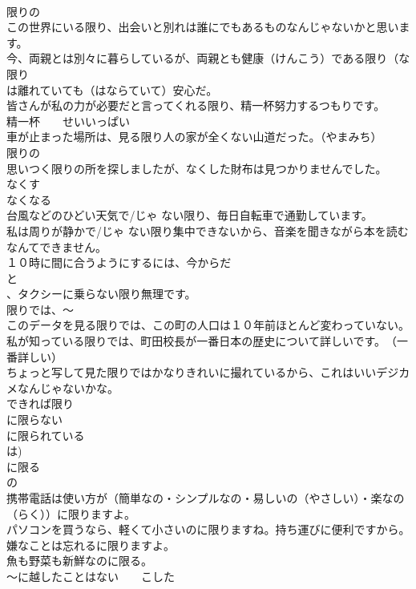 \documentclass[8pt]{extreport}
\begin{document}
\begin{CJK}{UTF8}{min}
\\	限りの
\\	この世界にいる限り、出会いと別れは誰にでもあるものなんじゃないかと思います。
\\	今、両親とは別々に暮らしているが、両親とも健康（けんこう）である限り（な限り 
\\	は離れていても（はならていて）安心だ。
\\	皆さんが私の力が必要だと言ってくれる限り、精一杯努力するつもりです。
\\	精一杯　　せいいっぱい
\\	車が止まった場所は、見る限り人の家が全くない山道だった。（やまみち）
\\	限りの
\\	思いつく限りの所を探しましたが、なくした財布は見つかりませんでした。
\\	なくす
\\	なくなる
\\	台風などのひどい天気で/じゃ ない限り、毎日自転車で通勤しています。
\\	私は周りが静かで/じゃ ない限り集中できないから、音楽を聞きながら本を読むなんてできません。
\\	１０時に間に合うようにするには、今からだ
\\	と
\\	、タクシーに乗らない限り無理です。
\\	限りでは、～
\\	このデータを見る限りでは、この町の人口は１０年前ほとんど変わっていない。
\\	私が知っている限りでは、町田校長が一番日本の歴史について詳しいです。　（一番詳しい）
\\	ちょっと写して見た限りではかなりきれいに撮れているから、これはいいデジカメなんじゃないかな。
\\	できれば限り　 
\\	に限らない
\\	に限られている
\\	は)
\\	に限る
\\	の 
\\	携帯電話は使い方が（簡単なの・シンプルなの・易しいの（やさしい）・楽なの（らく））に限りますよ。
\\	パソコンを買うなら、軽くて小さいのに限りますね。持ち運びに便利ですから。
\\	嫌なことは忘れるに限りますよ。
\\	魚も野菜も新鮮なのに限る。
\\	～に越したことはない　　こした

\end{CJK}
\end{document}
